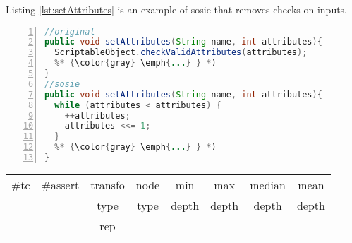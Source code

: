 Listing \ref{lst:setAttributes} is an example of sosie that removes checks on inputs.

\begin{minipage}{\columnwidth}
\begin{lstlisting}[caption={\texttt{setAttributes} in Rhino and a sosie},label=lst:setAttributes,language=java,numbers=left]
//original
public void setAttributes(String name, int attributes){
  ScriptableObject.checkValidAttributes(attributes);
  %* {\color{gray} \emph{...} } *)
}
//sosie
public void setAttributes(String name, int attributes){
  while (attributes < attributes) {
    ++attributes;
    attributes <<= 1;
  }
  %* {\color{gray} \emph{...} } *)
}\end{lstlisting}
\tabcolsep=0.11cm
\begin{tabular}{>{\small}c>{\small}c>{\small}c>{\small}c>{\small}c>{\small}c>{\small}c>{\small}c}
\hline
\rowcolor{lightgray} \#tc & \#assert & transfo & node & min & max & median & mean   \\
\rowcolor{lightgray}  & & type & type & depth  & depth & depth & depth  \\ 
\hline
&  & rep &  &  &  &  & \\
\hline
\end{tabular}
\end{minipage}


